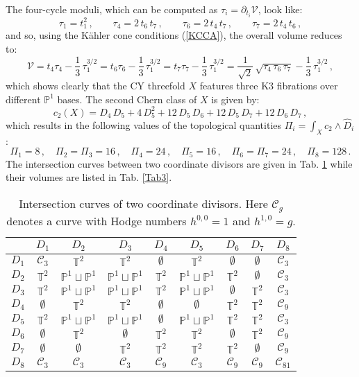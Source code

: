 \documentclass[11pt,a4paper]{article}
\newcommand{\be}{\begin{equation}}
\newcommand{\ee}{\end{equation}}
\newcommand{\T}{\mathbb{T}}
\newcommand{\mP}{\mathbb{P}}
\newcommand\vo{{\mathcal{V}}}
\newcommand{\mc}{\mathcal}
\begin{document}
The four-cycle moduli, which can be computed as $\tau_i = \partial_{t_i}\vo$, look like:
\be
\tau_1 = t_1^2\,, \qquad \tau_4 = 2\, t_6\, t_7\,, \qquad \tau_6 = 2\, t_4\, t_7\,, \qquad \tau_7 = 2\, t_4\, t_6\,,
\ee
and so, using the K\"ahler cone conditions (\ref{KCCA}), the overall volume reduces to:
\be
\vo = t_4\tau_4-\frac13\, \tau_1^{3/2} = t_6\tau_6-\frac13\, \tau_1^{3/2}
= t_7\tau_7-\frac13\, \tau_1^{3/2} = \frac{1}{\sqrt{2}}\,\sqrt{\tau_4\, \tau_6\, \tau_7} -\frac13\, \tau_1^{3/2}\,,
\ee
which shows clearly that the CY threefold $X$ features three K3 fibrations over different $\mP^1$ bases. 
The second Chern class of $X$ is given by:
\be
c_2 (X) = D_4 \, D_5 + 4\, D_5^2 + 12\, D_5 \, D_6 + 12\, D_5\, D_7 + 12\, D_6\, D_7\,,
\ee
which results in the following values of the topological quantities $\Pi_i=\int_X c_2 \wedge \hat{D}_i$:
\be
\Pi_1 = 8\,, \quad \Pi_2 = \Pi_3 =16\,, \quad \Pi_4 =24\,,
\quad \Pi_5 =16\,, \quad \Pi_6 = \Pi_7 =24\,, \quad\Pi_8 =128\,.
\label{Pi'sA}
\ee
The intersection curves between two coordinate divisors are given in Tab. \ref{Tab2} while their volumes are listed in Tab. \ref{Tab3}. 
\begin{table}[H]
  \centering
 \begin{tabular}{|c||c|c|c|c|c|c|c|c|}
\hline
 & $D_1$ & $D_2$ & $D_3$ & $D_4$ & $D_5$ & $D_6$ & $D_7$ & $D_8$   \\
    \hline
 $D_1$ & $\mc{C}_3$  & $\T^2$              & $\T^2$              & $\emptyset$ &  $\T^2$             & $\emptyset$ & $\emptyset$ & $\mc{C}_3$ \\
 $D_2$ & $\T^2$      & $\mP^1\sqcup \mP^1$ & $\mP^1\sqcup \mP^1$ & $\T^2$      & $\mP^1\sqcup \mP^1$ & $\T^2$      & $\emptyset$ & $\mc{C}_3$ \\
 $D_3$ & $\T^2$      & $\mP^1\sqcup \mP^1$ & $\mP^1\sqcup \mP^1$ & $\T^2$      & $\mP^1\sqcup \mP^1$ & $\emptyset$ & $\T^2$      & $\mc{C}_3$ \\
 $D_4$ & $\emptyset$ & $\T^2$              & $\T^2$              & $\emptyset$ & $\emptyset$         & $\T^2$      & $\T^2$      & $\mc{C}_9$ \\
 $D_5$ & $\T^2$      & $\mP^1\sqcup \mP^1$ & $\mP^1\sqcup \mP^1$ & $\emptyset$ & $\mP^1\sqcup \mP^1$ & $\T^2$      & $\T^2$      & $\mc{C}_3$ \\
 $D_6$ & $\emptyset$ & $\T^2$              & $\emptyset$         & $\T^2$      & $\T^2$              & $\emptyset$ & $\T^2$      & $\mc{C}_9$ \\
 $D_7$ & $\emptyset$ & $\emptyset$         & $\T^2$              & $\T^2$      & $\T^2$              & $\T^2$      & $\emptyset$ & $\mc{C}_9$ \\
 $D_8$ & $\mc{C}_3$  & $\mc{C}_3$          & $\mc{C}_3$          & $\mc{C}_9$  & $\mc{C}_3$          & $\mc{C}_9$  & $\mc{C}_9$  & $\mc{C}_{81}$ \\
    \hline
  \end{tabular}
  \caption{Intersection curves of two coordinate divisors. Here $\mc{C}_g$ denotes a curve with Hodge numbers $h^{0,0} = 1$ and $h^{1,0} = g$.}
	\label{Tab2}
 \end{table}
\end{document}
